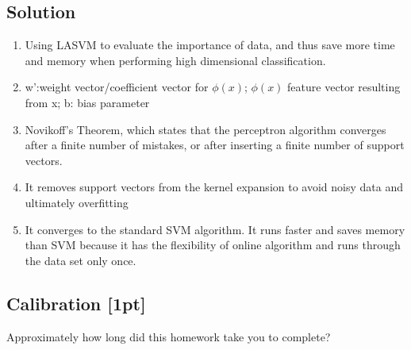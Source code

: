 \documentclass[submit]{harvardml}
\begin{document}
\subsection*{Solution}
\begin{enumerate}
\item Using LASVM to evaluate the importance of data, and thus save more time and memory when performing high dimensional classification.  

\item w':weight vector/coefficient vector for $\phi(x)$; $\phi(x)$ feature vector resulting from x; b: bias parameter

\item Novikoff’s Theorem, which states that the perceptron algorithm converges after a finite number of mistakes, or
after inserting a finite number of support vectors. 

\item It removes support vectors from the kernel expansion to avoid  noisy data and ultimately overfitting

\item It converges to the standard SVM algorithm. It runs faster and saves memory than SVM because it has the flexibility of online algorithm and runs through the  data set only once.

\end{enumerate}

\newpage

\subsection*{Calibration [1pt]}
Approximately how long did this homework take you to complete?
\end{document}
